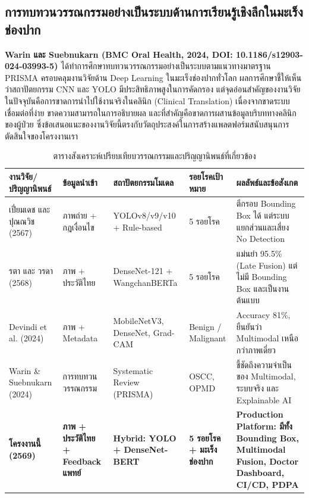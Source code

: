 \subsection{การทบทวนวรรณกรรมอย่างเป็นระบบด้านการเรียนรู้เชิงลึกในมะเร็งช่องปาก}
\textbf{Warin และ Suebnukarn (BMC Oral Health, 2024, DOI: 10.1186/s12903-024-03993-5) \cite{warin2024deep}} ได้ทำการศึกษาทบทวนวรรณกรรมอย่างเป็นระบบตามแนวทางมาตรฐาน PRISMA ครอบคลุมงานวิจัยด้าน Deep Learning ในมะเร็งช่องปากทั่วโลก ผลการศึกษาชี้ให้เห็นว่าสถาปัตยกรรม CNN และ YOLO มีประสิทธิภาพสูงในการคัดกรอง แต่จุดอ่อนสำคัญของงานวิจัยในปัจจุบันคือการขาดการนำไปใช้งานจริงในคลินิก (Clinical Translation) เนื่องจากขาดระบบเชื่อมต่อที่ง่าย ขาดความสามารถในการอธิบายผล และที่สำคัญคือขาดการผสานข้อมูลบริบททางคลินิกของผู้ป่วย ซึ่งข้อเสนอแนะของงานวิจัยนี้ตรงกับวัตถุประสงค์ในการสร้างแพลตฟอร์มสนับสนุนการตัดสินใจของโครงงานเรา

\begin{table}[H]
\centering
\small
\caption{ตารางสังเคราะห์เปรียบเทียบวรรณกรรมและปริญญานิพนธ์ที่เกี่ยวข้อง}
\label{tab:synthesis_matrix}
\begin{tabular}{p{2.8cm}p{2.2cm}p{2.8cm}p{2.2cm}p{3.5cm}}
\toprule
\textbf{งานวิจัย/ปริญญานิพนธ์} & \textbf{ข้อมูลนำเข้า} & \textbf{สถาปัตยกรรมโมเดล} & \textbf{รอยโรคเป้าหมาย} & \textbf{ผลลัพธ์และข้อสังเกต} \\
\midrule
เปี่ยมเดช และ ปุณณวิช (2567) \cite{piamdech2024oral} & ภาพถ่าย + กฎเงื่อนไข & YOLOv8/v9/v10 + Rule-based & 5 รอยโรค & ตีกรอบ Bounding Box ได้ แต่ระบบแยกส่วนและเสี่ยง No Detection \\
รตา และ วรดา (2568) \cite{unnahasarakhon2025multimodal} & ภาพ + ประวัติไทย & DenseNet-121 + WangchanBERTa & 5 รอยโรค & แม่นยำ 95.5\% (Late Fusion) แต่ไม่มี Bounding Box และเป็นงานต้นแบบ \\
Devindi et al. (2024) \cite{devindi2024multimodal} & ภาพ + Metadata & MobileNetV3, DenseNet, Grad-CAM & Benign / Malignant & Accuracy 81\%, ยืนยันว่า Multimodal เหนือกว่าภาพเดี่ยว \\
Warin \& Suebnukarn (2024) \cite{warin2024deep} & การทบทวนวรรณกรรม & Systematic Review (PRISMA) & OSCC, OPMD & ชี้ชัดถึงความจำเป็นของ Multimodal, ระบบจริง และ Explainable AI \\
\textbf{โครงงานนี้ (2569)} & \textbf{ภาพ + ประวัติไทย + Feedback แพทย์} & \textbf{Hybrid: YOLO + DenseNet-BERT} & \textbf{5 รอยโรค + มะเร็งช่องปาก} & \textbf{Production Platform: มีทั้ง Bounding Box, Multimodal Fusion, Doctor Dashboard, CI/CD, PDPA} \\
\bottomrule
\end{tabular}
\end{table}

